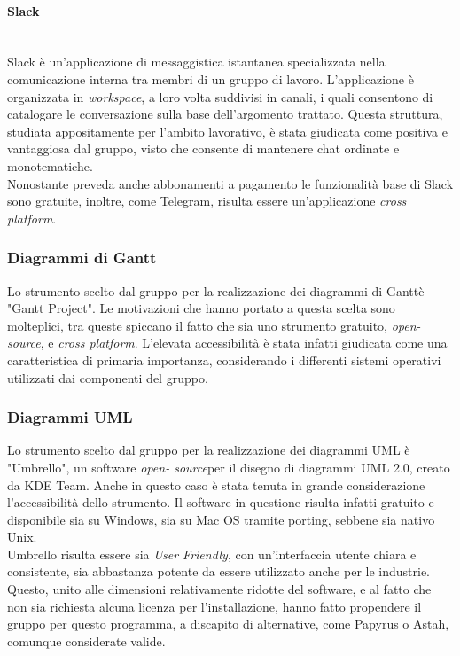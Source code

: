 \paragraph{Slack} ~\\
	Slack è un'applicazione di messaggistica istantanea specializzata nella comunicazione interna tra membri di un 			gruppo di lavoro. L'applicazione è organizzata in \textit{workspace}, a loro volta suddivisi in canali, i quali 			consentono di catalogare le conversazione sulla base dell'argomento trattato. Questa struttura, studiata 						appositamente per l'ambito lavorativo, è stata giudicata come positiva e vantaggiosa dal gruppo, visto che 					consente di mantenere chat ordinate e monotematiche.\\
	Nonostante preveda anche abbonamenti a pagamento le funzionalità base di Slack sono gratuite, inoltre, come 					Telegram, risulta essere un'applicazione \textit{cross platform}\glossario.

\subsubsection{Diagrammi di Gantt}
	Lo strumento scelto dal gruppo per la realizzazione dei diagrammi di Gantt\glossario è "Gantt Project". Le 					motivazioni che hanno portato a questa scelta sono molteplici, tra queste spiccano il fatto che sia uno strumento 	gratuito, \textit{open-source}\glossario, e \textit{cross platform}. L'elevata accessibilità è stata infatti 				giudicata come una caratteristica di primaria importanza, considerando i differenti sistemi operativi utilizzati 		dai componenti del gruppo.

\subsubsection{Diagrammi UML}
	Lo strumento scelto dal gruppo per la realizzazione dei diagrammi UML è "Umbrello", un software \textit{open-				source}\glossario per il disegno di diagrammi UML 2.0, creato da KDE Team. Anche in questo caso è stata tenuta in 	grande considerazione l'accessibilità dello strumento. Il software in questione risulta infatti gratuito e 					disponibile sia su Windows, sia su Mac OS tramite porting, sebbene sia nativo Unix.\\
	Umbrello risulta essere sia \textit{User Friendly}, con un'interfaccia utente chiara e consistente, sia 							abbastanza potente da essere utilizzato anche per le industrie. Questo, unito alle dimensioni relativamente 					ridotte del software, e al fatto che non sia richiesta alcuna licenza per l'installazione, hanno fatto propendere 	il gruppo per questo programma, a discapito di alternative, come Papyrus o Astah, comunque considerate valide.

